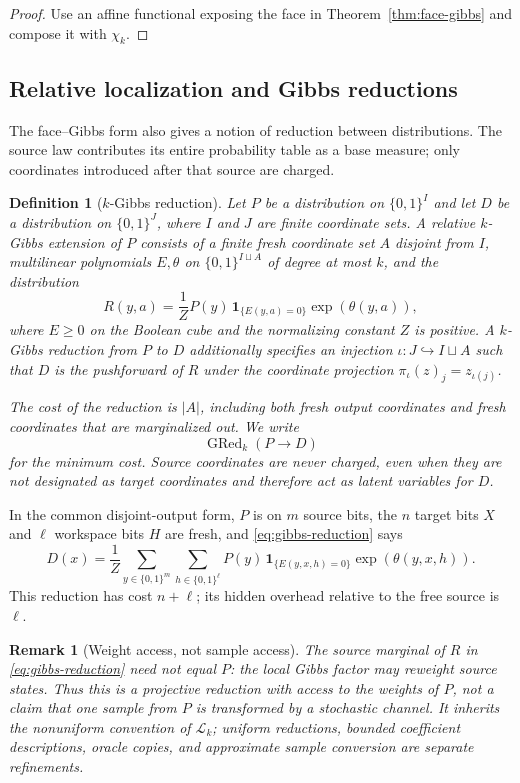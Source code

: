 \documentclass{article}
\newcommand{\LC}{\mathcal{L}}
\newcommand{\GRed}{\operatorname{GRed}}
\newcommand{\bits}{\{0,1\}}
\newtheorem{definition}{Definition}
\newtheorem{remark}{Remark}
\begin{document}
\begin{proof}
Use an affine functional exposing the face in
Theorem~\ref{thm:face-gibbs} and compose it with $\chi_k$.
\end{proof}

\subsection{Relative localization and Gibbs reductions}
\label{sec:gibbs-reductions}

The face--Gibbs form also gives a notion of reduction between distributions.
The source law contributes its entire probability table as a base measure;
only coordinates introduced after that source are charged.

\begin{definition}[$k$-Gibbs reduction]
\label{def:gibbs-reduction}
Let $P$ be a distribution on $\bits^I$ and let $D$ be a distribution on
$\bits^J$, where $I$ and $J$ are finite coordinate sets.  A relative
$k$-Gibbs extension of $P$ consists of a finite fresh coordinate set $A$
disjoint from $I$, multilinear polynomials $E,\theta$ on
$\bits^{I\sqcup A}$ of degree at most $k$, and the distribution
\[
  R(y,a)=\frac{1}{Z}
  P(y)\,\mathbf 1_{\{E(y,a)=0\}}\exp(\theta(y,a)),
  \tag{GR}\label{eq:gibbs-reduction}
\]
where $E\ge0$ on the Boolean cube and the normalizing constant $Z$ is
positive.  A $k$-Gibbs reduction from $P$ to $D$ additionally specifies an
injection $\iota:J\hookrightarrow I\sqcup A$ such that $D$ is the pushforward
of $R$ under the coordinate projection
$\pi_\iota(z)_j=z_{\iota(j)}$.

The cost of the reduction is $|A|$, including both fresh output coordinates
and fresh coordinates that are marginalized out.  We write
\[
  \GRed_k(P\mathbin{\to}D)
\]
for the minimum cost.  Source coordinates are never charged, even when they
are not designated as target coordinates and therefore act as latent
variables for $D$.
\end{definition}

In the common disjoint-output form, $P$ is on $m$ source bits, the $n$ target
bits $X$ and $\ell$ workspace bits $H$ are fresh, and
\eqref{eq:gibbs-reduction} says
\[
  D(x)=\frac{1}{Z}
  \sum_{y\in\bits^m}\sum_{h\in\bits^\ell}
  P(y)\,\mathbf 1_{\{E(y,x,h)=0\}}\exp(\theta(y,x,h)).
  \tag{GR$'$}\label{eq:gibbs-reduction-disjoint}
\]
This reduction has cost $n+\ell$; its hidden overhead relative to the free
source is $\ell$.

\begin{remark}[Weight access, not sample access]
The source marginal of $R$ in \eqref{eq:gibbs-reduction} need not equal $P$:
the local Gibbs factor
may reweight source states.  Thus this is a projective reduction with access
to the weights of $P$, not a claim that one sample from $P$ is transformed by
a stochastic channel.  It inherits the nonuniform convention of $\LC_k$;
uniform reductions, bounded coefficient descriptions, oracle copies, and
approximate sample conversion are separate refinements.
\end{remark}
\end{document}
